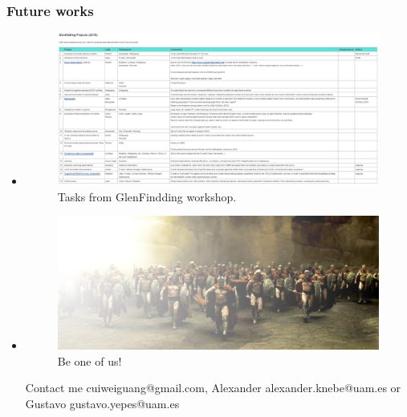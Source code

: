 \documentclass[aspectratio=43]{beamer}
\begin{document}
\begin{frame}
  \frametitle{Future works}
  \begin{itemize}
    \item<1|only@1>[]{
    \begin{figure}
      \includegraphics[width=\linewidth]{Tasks18}
      \caption{Tasks from GlenFindding workshop.}
    \end{figure}}
    \item<2|only@2>[]{
      \begin{figure}
        \includegraphics[width=\linewidth]{The300}
        \caption{Be one of us!}
      \end{figure}
      Contact me \alert{cuiweiguang@gmail.com}, Alexander \alert{alexander.knebe@uam.es} or Gustavo \alert{gustavo.yepes@uam.es}}
  \end{itemize}

\end{frame}
\end{document}
